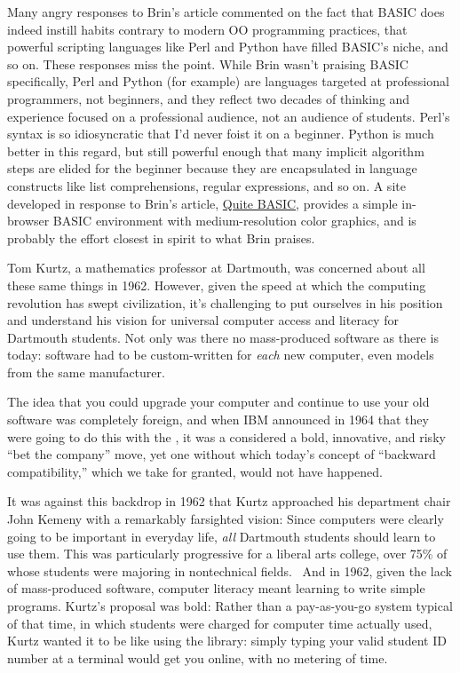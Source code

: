\documentclass{article}
\begin{document}
\begin{geeknote}
Many angry responses to Brin's article commented on the fact that BASIC
does indeed instill habits contrary to modern OO programming practices,
that powerful scripting languages like Perl and Python have filled BASIC's
niche, and so on.  These responses miss the point.  While Brin wasn't
praising BASIC specifically, Perl and Python (for example) are languages
targeted at professional programmers, not beginners, and they
reflect two decades of thinking and experience focused on a professional audience,
not an audience of students.  Perl's syntax is so idiosyncratic that I'd
never foist it on a beginner. Python is much better in this regard, but
still powerful enough that many implicit algorithm steps are elided for
the beginner because they are encapsulated in language constructs like
list comprehensions, regular expressions, and so on.
A site developed in response to Brin's article, 
\href{http://quitebasic.com}{Quite BASIC}, provides a simple in-browser
BASIC environment with medium-resolution color graphics, and is probably
the effort closest in spirit to what Brin praises.

\end{geeknote}

Tom Kurtz, a mathematics professor at Dartmouth, was concerned about all
these same things in 1962.
However, given the speed at which the computing revolution has swept
civilization, it's challenging to put ourselves in his position and
understand his vision for universal computer access and literacy for
Dartmouth students.
Not only was there no mass-produced software as
there is today: software  had to be custom-written for \emph{each} new
computer, even models from the same manufacturer.  

  \begin{geeknote}
  The idea that
  you could upgrade your computer and continue to use your old software
  was completely foreign, and when IBM announced in 1964 that
  they were going to do this with the , it was a considered a bold,
  innovative, and risky ``bet the
  company'' move, yet one without which today's concept of ``backward
  compatibility,'' which we take for granted, would not have happened.
  \end{geeknote}

It was against this backdrop 
in 1962 that Kurtz approached
his department chair John Kemeny with a remarkably farsighted vision:
Since computers were clearly going to be important in everyday
life, \emph{all} Dartmouth students should learn to use them.  This was
particularly progressive for a liberal arts college,
over 75\% of whose students were majoring in nontechnical fields.~\cite{goto}
And in 1962, given the lack of mass-produced software,
computer literacy meant learning to
write simple programs.
Kurtz's proposal was bold: Rather than a
pay-as-you-go system typical of that time, in which students were
charged for computer time 
actually used,
Kurtz wanted it to be like using the library:
simply typing your valid student ID number at a terminal would get you
online, with no metering of time.
\end{document}
